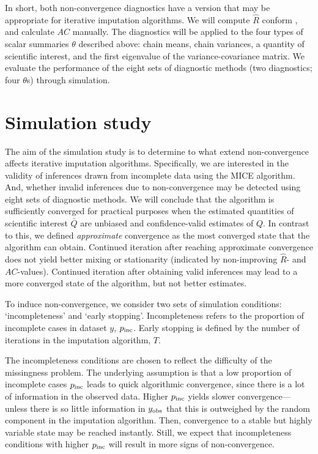 \documentclass[Royal,times,sageh]{sagej}
\begin{document}
\noindent In short, both non-convergence diagnostics have a version that may be appropriate for iterative imputation algorithms. We will compute \(\widehat{R}\) conform \citet{veht19}, and calculate \(AC\) manually. The diagnostics will be applied to the four types of scalar summaries \(\theta\) described above: chain means, chain variances, a quantity of scientific interest, and the first eigenvalue of the variance-covariance matrix. We evaluate the performance of the eight sets of diagnostic methods (two diagnostics; four \(\theta\)s) through simulation.

\hypertarget{simulation-study}{%
\section{Simulation study}\label{simulation-study}}

The aim of the simulation study is to determine to what extend non-convergence affects iterative imputation algorithms. Specifically, we are interested in the validity of inferences drawn from incomplete data using the MICE algorithm. And, whether invalid inferences due to non-convergence may be detected using eight sets of diagnostic methods. We will conclude that the algorithm is sufficiently converged for practical purposes when the estimated quantities of scientific interest \(\bar{Q}\) are unbiased and confidence-valid estimates of \({Q}\). In contrast to this, we defined \emph{approximate} convergence as the most converged state that the algorithm can obtain. Continued iteration after reaching approximate convergence does not yield better mixing or stationarity (indicated by non-improving \(\widehat{R}\)- and \(AC\)-values). Continued iteration after obtaining valid inferences may lead to a more converged state of the algorithm, but not better estimates.

To induce non-convergence, we consider two sets of simulation conditions: `incompleteness' and `early stopping'. Incompleteness refers to the proportion of incomplete cases in dataset \(y\), \(p_{\rm inc}\). Early stopping is defined by the number of iterations in the imputation algorithm, \(T\).

The incompleteness conditions are chosen to reflect the difficulty of the missingness problem. The underlying assumption is that a low proportion of incomplete cases \(p_{\rm inc}\) leads to quick algorithmic convergence, since there is a lot of information in the observed data. Higher \(p_{\rm inc}\) yields slower convergence---unless there is so little information in \(y_{\rm obs}\) that this is outweighed by the random component in the imputation algorithm. Then, convergence to a stable but highly variable state may be reached instantly. Still, we expect that incompleteness conditions with higher \(p_{\rm inc}\) will result in more signs of non-convergence.
\end{document}
